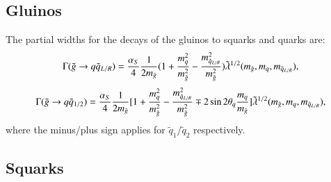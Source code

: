 \documentclass[final,3p,times]{elsarticle}
\begin{document}
\subsection{Gluinos} \label{Gluinos}
The partial widths for the decays of the gluinos to squarks and quarks are:
\begin{equation}\label{gluqqLR}
\Gamma(\tilde{g} \rightarrow q \tilde{q}_{L/R}) = {\alpha_{S} \over 4} {1 \over 2m_{\tilde{g}}} (1 + {m_{q}^2 \over m_{\tilde{g}}^2} - {m_{\tilde{q}_{L/R}}^2 \over m_{\tilde{g}}^2}) \tilde{\lambda}^{1/2} (m_{\tilde{g}}, m_q, m_{\tilde{q}_{L/R}}), 
\end{equation} 
\begin{equation}\label{gluqq12}
\Gamma(\tilde{g} \rightarrow q \tilde{q}_{1/2}) = {\alpha_{S} \over 4} {1 \over 2m_{\tilde{g}}} [1 + {m_{q}^2 \over m_{\tilde{g}}^2} - {m_{\tilde{q}_{L/R}}^2 \over m_{\tilde{g}}^2} \mp 2\sin2\theta_q {m_q \over m_{\tilde{g}}}]  \tilde{\lambda}^{1/2} (m_{\tilde{g}}, m_q, m_{\tilde{q}_{L/R}}),
\end{equation} 
where the minus/plus sign applies for $\tilde{q}_1$/$\tilde{q}_2$ respectively.

\subsection{Squarks} \label{Squarks}
\end{document}
